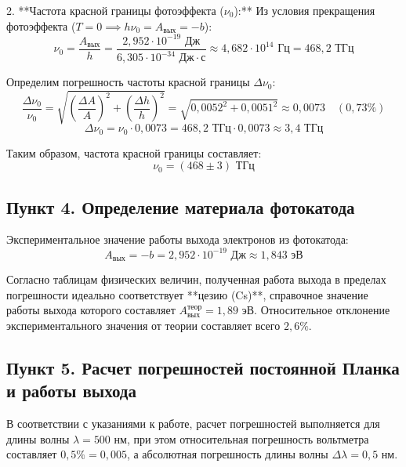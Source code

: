 \documentclass[a4paper,12pt]{article}
\begin{document}
2. **Частота красной границы фотоэффекта ($\nu_0$):**
Из условия прекращения фотоэффекта ($T = 0 \implies h\nu_0 = A_{\text{вых}} = -b$):
\begin{equation*}
\nu_0 = \frac{A_{\text{вых}}}{h} = \frac{2{,}952 \cdot 10^{-19} \text{ Дж}}{6{,}305 \cdot 10^{-34} \text{ Дж}\cdot\text{с}} \approx 4{,}682 \cdot 10^{14} \text{ Гц} = 468{,}2 \text{ ТГц}
\end{equation*}

Определим погрешность частоты красной границы $\Delta \nu_0$:
\begin{equation*}
\frac{\Delta \nu_0}{\nu_0} = \sqrt{\left(\frac{\Delta A}{A}\right)^2 + \left(\frac{\Delta h}{h}\right)^2} = \sqrt{0{,}0052^2 + 0{,}0051^2} \approx 0{,}0073 \quad (0{,}73\%)
\end{equation*}
\begin{equation*}
\Delta \nu_0 = \nu_0 \cdot 0{,}0073 = 468{,}2 \text{ ТГц} \cdot 0{,}0073 \approx 3{,}4 \text{ ТГц}
\end{equation*}

Таким образом, частота красной границы составляет:
\begin{equation*}
\nu_0 = (468 \pm 3) \text{ ТГц}
\end{equation*}

\subsection*{Пункт 4. Определение материала фотокатода}

Экспериментальное значение работы выхода электронов из фотокатода:
\begin{equation*}
A_{\text{вых}} = -b = 2{,}952 \cdot 10^{-19} \text{ Дж} \approx 1{,}843 \text{ эВ}
\end{equation*}

Согласно таблицам физических величин, полученная работа выхода в пределах погрешности идеально соответствует **цезию (Cs)**, справочное значение работы выхода которого составляет $A_{\text{вых}}^{\text{теор}} = 1{,}89$ эВ. Относительное отклонение экспериментального значения от теории составляет всего $2{,}6\%$.

\subsection*{Пункт 5. Расчет погрешностей постоянной Планка и работы выхода}

В соответствии с указаниями к работе, расчет погрешностей выполняется для длины волны $\lambda = 500$ нм, при этом относительная погрешность вольтметра составляет $0{,}5\% = 0{,}005$, а абсолютная погрешность длины волны $\Delta \lambda = 0{,}5$ нм.
\end{document}
